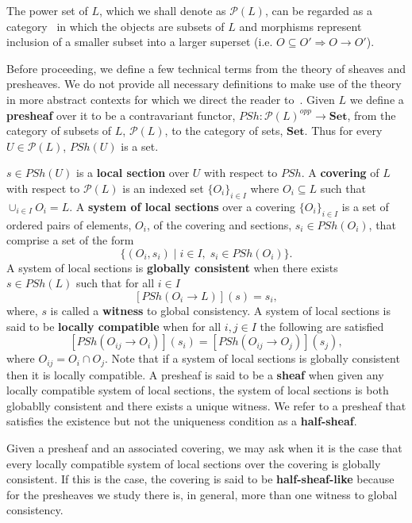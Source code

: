 The power set of $L$, which we shall denote as $\mathcal{P}(L)$, can be regarded  as a category~\cite{Lane1998,MacLane1992,Awodey2006,Abramsky2011} in which the objects are subsets of $L$ and morphisms represent inclusion of a smaller subset into a larger superset (i.e. $O \subseteq O' \Rightarrow O \rightarrow O'$).

\noindent\makebox[\linewidth]{\rule{\paperwidth}{0.4pt}}

Before proceeding, we define a few technical terms from the theory of sheaves and presheaves. We do not provide all necessary definitions to make use of the theory in more abstract contexts for which we direct the reader to~\cite{Lane1998}. Given $L$ we define a \textbf{presheaf} over it to be a contravariant functor, $PSh \colon\mathcal{P}(L)^{opp} \rightarrow \mathbf{Set}$, from the category of subsets of $L$, $\mathcal{P}(L)$, to the category of sets, $\mathbf{Set}$. Thus for every $U \in \mathcal{P}(L)$, $PSh(U)$ is a set.

$s \in PSh(U)$ is a \textbf{local section} over $U$ with respect to $PSh$. A \textbf{covering} of $L$ with respect to $\mathcal{P}(L)$ is an indexed set $\{O_i\}_{i \in I}$ where $O_i \subseteq L$ such that $\cup_{i \in I} O_i = L$.
A \textbf{system of local sections} over a covering $\{O_i\}_{i \in I}$ is a set of ordered pairs of elements, $O_i$, of the covering and sections, $s_i \in PSh(O_i)$, that comprise a set of the form
$$
\{(O_i,s_i) \; \vert \; i \in I, \; s_i \in PSh(O_i) \}.
$$
A system of local sections is \textbf{globally consistent} when there exists $s \in PSh(L)$ such that for all $i \in I$
$$
[ PSh( O_i \rightarrow L) ] (s) = s_i,
$$
where, $s$ is called a \textbf{witness} to global consistency.
A system of local sections is said to be \textbf{locally compatible} when for all $i,j \in I$ the following are satisfied
$$
[ PSh( O_{ij} \rightarrow O_i) ] (s_i) = [ PSh( O_{ij} \rightarrow O_j) ] (s_j),
$$
where $O_{ij} = O_i \cap O_j$.
Note that if a system of local sections is globally consistent then it is locally compatible. A presheaf is said to be a \textbf{sheaf} when given any locally compatible system of local sections, the system of local sections is both globablly consistent and there exists a unique witness. We refer to a presheaf that satisfies the existence but not the uniqueness condition as a \textbf{half-sheaf}.

Given a presheaf and an associated covering, we may ask when it is the case that every locally compatible system of local sections over the covering is globally consistent. If this is the case, the covering is said to be \textbf{half-sheaf-like} because for the presheaves we study there is, in general, more than one witness to global consistency.

